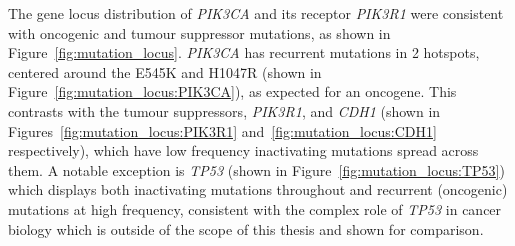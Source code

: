 The gene locus distribution of \textit{PIK3CA} and its receptor \textit{PIK3R1} were consistent with oncogenic and \gls{tumour suppressor} \glspl{mutation}, as shown in Figure~\ref{fig:mutation_locus}. \textit{PIK3CA} has \glspl{recurrent mutation} in 2 hotspots, centered around the E545K and H1047R (shown in Figure~\ref{fig:mutation_locus:PIK3CA}), as expected for an \gls{oncogene}. This contrasts with the \glspl{tumour suppressor}, \textit{PIK3R1}, and \textit{CDH1} (shown in Figures~\ref{fig:mutation_locus:PIK3R1} and~\ref{fig:mutation_locus:CDH1} respectively), which have low frequency inactivating \glspl{mutation} spread across them. A notable exception is \textit{TP53} (shown in Figure~\ref{fig:mutation_locus:TP53}) which displays both inactivating \glspl{mutation} throughout and recurrent (oncogenic) \glspl{mutation} at high frequency, consistent with the complex role of \textit{TP53} in cancer biology which is outside of the scope of this thesis and shown for comparison. 


